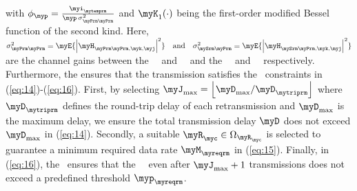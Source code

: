 with
$\phi_{\myp} = \frac{\myi_{\mytemprm}}{\myp\,\sigma_{\myPrm\myPrm}^{2}}$
and $\myK_{1}(\cdot)$ being the first-order modified Bessel function of the second kind.
Here,
$\sigma_{\myPrm\myPrm}^{2}
    = \myE{ \left| \myH_{\myPrm\myPrm,\myk,\myj} \right|^{2} }
\quad\text{and}\quad
\sigma_{\mySrm\myPrm}^{2}
    = \myE{ \left| \myH_{\mySrm\myPrm,\myk,\myj} \right|^{2}}$ are the channel gains between the \myPU\ \myTX\ and \myPU\ \myRX\, and the
\mySU\ \myTX\ and \myPU\ \myRX\, respectively. 
Furthermore, the \myCLO{} ensures that the \mySU{}
transmission satisfies the \myQoS\ constraints in (\ref{eq:14})-(\ref{eq:16}). First, by selecting
$\myJ_{\max} = \left\lfloor \myD_{\max}/\myD_{\mytriprm}\right\rfloor$ where $\myD_{\mytriprm}$ defines the round-trip delay of each
retransmission and $\myD_{\max}$ is the maximum delay, we ensure the total
transmission delay $\myD$ does not exceed $\myD_{\max}$ in (\ref{eq:14}).
Secondly, a suitable \linebreak
\newpage
$\myR_\myc \in \Omega_{\myR_\myc}$ is selected to guarantee a minimum required data
rate $\myM_{\myreqrm}$ in (\ref{eq:15}). Finally, in (\ref{eq:16}), the \myCLO\ ensures that the
\mySU\ \myPEP\ even after $\myJ_{\max}+1$ transmissions does not exceed a predefined threshold $\myp_{\myreqrm}$.




